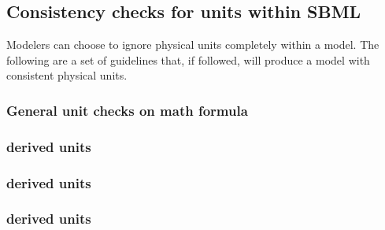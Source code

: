 \subsection{Consistency checks for units within SBML}

Modelers can choose to ignore physical units completely 
within a model.  The following are a set of guidelines that,
if followed, will produce a model with consistent physical units.

\subsubsection*{General unit checks on math formula} \begin{sbmlenum}


\end{sbmlenum} 

\subsubsection*{ derived units} \begin{sbmlenum}


\end{sbmlenum} 

\subsubsection*{ derived units} \begin{sbmlenum}


\end{sbmlenum} 

\subsubsection*{ derived units} \begin{sbmlenum}


\end{sbmlenum} 

